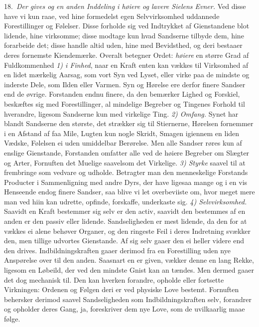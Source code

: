 \documentclass[12pt,a4paper]{article}
\newcommand{\opage}[1]{\marginnote{\footnotesize\textit{[#1]}}}
\begin{document}
18.~\emph{Der gives og en anden Inddeling i høiere og lavere Sielens Evner.} Ved
disse have vi kun raae, ved hine formedelst egen Selvvirksomhed uddannede
Forestillinger og Følelser. Disse forholde sig ved Indtrykket af Gienstandene blot
lidende, hine virksomme; disse modtage kun hvad Sandserne tilbyde dem, hine
forarbeide det; disse handle altid uden, hine med Bevidsthed, og deri bestaaer
deres fornemste Kiendemærke. Overalt betegner Ordet: \emph{høiere} en større Grad
af Fuldkommenhed \emph{1) i Finhed}, naar en Kraft enten kan vækkes til Virksomhed
af en lidet mærkelig Aarsag, som vort Syn ved Lyset, eller virke paa de mindste og
inderste Dele, som Ilden eller Varmen. Syn og Hørelse ere derfor finere Sandser end
de øvrige. Forstanden endnu finere, da den bemærker Lighed og Forskiel, beskæftes
sig med Forestillinger, al%
\opage{33}mindelige Begreber og Tingenes Forhold til hverandre, ligesom Sandserne kun med
virkelige Ting. \emph{2) Omfang.} Synet har blandt Sandserne den største, det
strækker sig til Stiernerne, Hørelsen fornemmer i en Afstand af faa Mile, Lugten
kun nogle Skridt, Smagen igiennem en liden Vædske, Følelsen ei uden umiddelbar
Berørelse. Men alle Sandser røres kun af enslige Gienstande, Forstanden omfatter
alle ved de høiere Begreber om Slægter og Arter, Fornuften det Muelige saavelsom
det Virkelige. \emph{3) Styrke} saavel til at frembringe som vedvare og udholde.
Betragter man den menneskelige Forstands Producter i Sammenligning med andre Dyrs,
der have ligesaa mange og i en vis Henseende endog finere Sandser, saa blive vi
let overbeviiste om, hvor meget mere man ved hiin kan udrette, opfinde, forskaffe,
underkaste sig. \emph{4) Selvvirksomhed.} Saavidt en Kraft bestemmer sig selv er
den activ, saavidt den bestemmes af en anden er den passiv eller lidende.
Sandseligheden er mest lidende, da den for at vækkes ei alene behøver Organer, og
den ringeste Feil i deres Indretning svækker den, men tillige udvortes Gienstande.
Af sig selv gaaer den ei heller videre end den drives. Indbildningskraften gaaer
derimod fra en Forestilling uden nye Anspørelse over til den anden. Saasnart en er
given, vækker denne en lang Rekke, ligesom en Løbeild, der ved den mindste Gnist
kan an%
\opage{34}tændes. Men dermed gaaer det dog mechanisk til. Den kan hverken forandre, opholde
eller fortsette Virkningen: Ordenen og Følgen deri er ved physiske Love bestemt.
Fornuften behersker derimod saavel Sandseligheden som Indbildningskraften selv,
forandrer og opholder deres Gang, ja, foreskriver dem nye Love, som de uvilkaarlig
maae følge.
\end{document}
